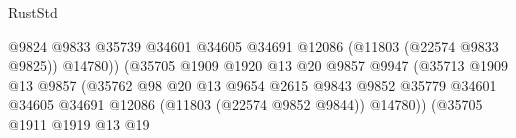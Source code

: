 \begin{lexlean}{RustStd}
\begin{coremodule}
                                                          @9824
                                                          @9833
                                                          @35739
                                                          @34601
                                                          @34605
                                                          @34691
                                                          @12086
                                                          (@11803 (@22574 @9833 @9825))
                                                          @14780))
                                                      (@35705
                                                        @1909
                                                        @1920
                                                        @13
                                                        @20
                                                        @9857
                                                        @9947
                                                        (@35713
                                                          @1909
                                                          @13
                                                          @9857
                                                          (@35762
                                                            @98
                                                            @20
                                                            @13
                                                            @9654
                                                            @2615
                                                            @9843
                                                            @9852
                                                            @35779
                                                            @34601
                                                            @34605
                                                            @34691
                                                            @12086
                                                            (@11803 (@22574 @9852 @9844))
                                                            @14780))
                                                        (@35705
                                                          @1911
                                                          @1919
                                                          @13
                                                          @19

\end{coremodule}
\end{lexlean}
